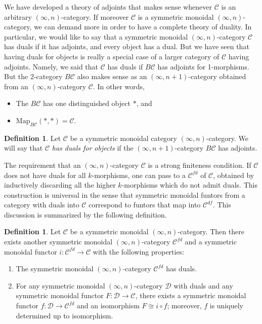 \documentclass[a4paper,11pt]{article}
\newcommand{\ccal}{\mathcal{C}}
\newcommand{\dcal}{\mathcal{D}}
\theoremstyle{plain}
\theoremstyle{definition}
\newtheorem{defi}[thm]{Definition}
\theoremstyle{remark}
\begin{document}
We have developed a theory of adjoints that makes sense whenever $\ccal$ is an arbitrary $(\infty, n)$-category. If moreover $\ccal$ is a symmetric monoidal $(\infty, n)$-category, we can demand more in order to have a complete theory of duality. In particular, we would like to say that a symmetric monoidal $(\infty, n)$-category $\ccal$ has duals if it has adjoints, and every object has a dual. But we have seen that having duals for objects is really a special case of a larger category of $\ccal$ having adjoints. Namely, we said that $\ccal$ has duals if $B\ccal$ has adjoints for 1-morphisms. But the 2-category $B\ccal$ also makes sense as an $(\infty, n+1)$-category obtained from an $(\infty, n)$-category $\ccal$. In other words, 
\begin{itemize}
    \item The $B \ccal$ has one distinguished object $*$, and 
    \item $\text{Map}_{B \ccal}(*, *) = \ccal$. 
\end{itemize}

\begin{defi}
Let $\ccal$ be a symmetric monoidal category $(\infty, n)$-category. We will say that $\ccal$ \textit{has duals for objects} if the $(\infty, n+1)$-category $B \ccal$ has adjoints. 
\end{defi}

The requirement that an $(\infty, n)$-category $\ccal$ is a strong finiteness condition. If $\ccal$ does not have duals for all $k$-morphisms, one can pass to a  $\ccal^{fd}$ of $\ccal$, obtained by inductively discarding all the higher $k$-morphisms which do not admit duals. This construction is universal in the sense that symmetric monoidal funtors from a category with duals into $\ccal$ correspond to funtors that map into $\ccal^{df}$. This discussion is summarized by the following definition.



\begin{defi}
Let $\ccal$ be a symmetric monoidal $(\infty, n)$-category. Then there exists another symmetric monoidal $(\infty, n)$-category $\ccal^{fd}$ and a symmetric monoidal functor $i \colon \ccal^{fd} \to \ccal$ with the following properties:
\begin{enumerate}[label = \arabic*)]
    \item The symmetric monoidal $(\infty, n)$-category $\ccal^{fd}$ has duals.
    \item For any symmetric monoidal $(\infty, n)$-category $\dcal$ with duals and any symmetric monoidal functor $F \colon \dcal \to \ccal$, there exists a symmetric monoidal functor $f \colon \dcal \to \ccal^{fd}$ and an isomorphism $F \cong i \circ f$; moreover, $f$ is uniquely determined up to isomorphism. 
\end{enumerate}
\end{defi}
\end{document}
